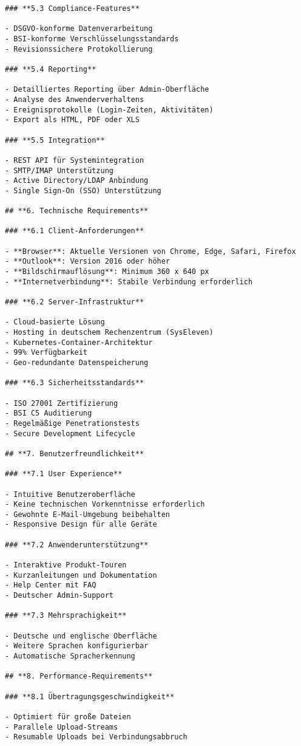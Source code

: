 \begin{verbatim}
### **5.3 Compliance-Features**

- DSGVO-konforme Datenverarbeitung
- BSI-konforme Verschlüsselungsstandards
- Revisionssichere Protokollierung

### **5.4 Reporting**

- Detailliertes Reporting über Admin-Oberfläche
- Analyse des Anwenderverhaltens
- Ereignisprotokolle (Login-Zeiten, Aktivitäten)
- Export als HTML, PDF oder XLS

### **5.5 Integration**

- REST API für Systemintegration
- SMTP/IMAP Unterstützung
- Active Directory/LDAP Anbindung
- Single Sign-On (SSO) Unterstützung

## **6. Technische Requirements**

### **6.1 Client-Anforderungen**

- **Browser**: Aktuelle Versionen von Chrome, Edge, Safari, Firefox
- **Outlook**: Version 2016 oder höher
- **Bildschirmauflösung**: Minimum 360 x 640 px
- **Internetverbindung**: Stabile Verbindung erforderlich

### **6.2 Server-Infrastruktur**

- Cloud-basierte Lösung
- Hosting in deutschem Rechenzentrum (SysEleven)
- Kubernetes-Container-Architektur
- 99% Verfügbarkeit
- Geo-redundante Datenspeicherung

### **6.3 Sicherheitsstandards**

- ISO 27001 Zertifizierung
- BSI C5 Auditierung
- Regelmäßige Penetrationstests
- Secure Development Lifecycle

## **7. Benutzerfreundlichkeit**

### **7.1 User Experience**

- Intuitive Benutzeroberfläche
- Keine technischen Vorkenntnisse erforderlich
- Gewohnte E-Mail-Umgebung beibehalten
- Responsive Design für alle Geräte

### **7.2 Anwenderunterstützung**

- Interaktive Produkt-Touren
- Kurzanleitungen und Dokumentation
- Help Center mit FAQ
- Deutscher Admin-Support

### **7.3 Mehrsprachigkeit**

- Deutsche und englische Oberfläche
- Weitere Sprachen konfigurierbar
- Automatische Spracherkennung

## **8. Performance-Requirements**

### **8.1 Übertragungsgeschwindigkeit**

- Optimiert für große Dateien
- Parallele Upload-Streams
- Resumable Uploads bei Verbindungsabbruch


\end{verbatim}
